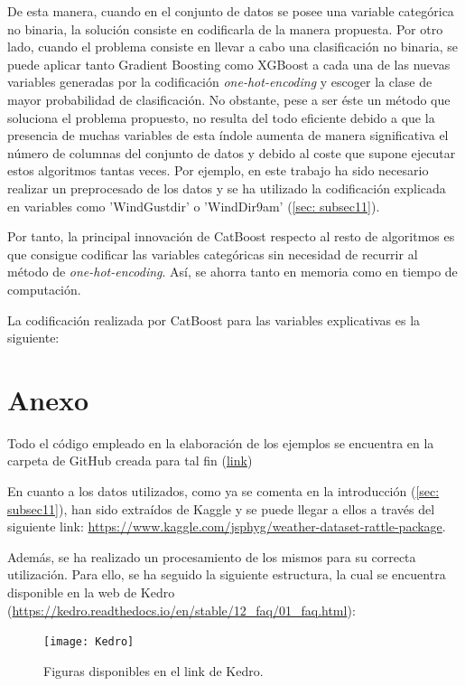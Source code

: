 \documentclass[12pt,twoside]{article}
\begin{document}
De esta manera, cuando en el conjunto de datos se posee una variable categórica no binaria, la solución consiste en codificarla de la manera propuesta. Por otro lado, cuando el problema consiste en llevar a cabo una clasificación no binaria, se puede aplicar tanto Gradient Boosting como XGBoost a cada una de las nuevas variables generadas por la codificación \textit{one-hot-encoding} y escoger la clase de mayor probabilidad de clasificación. No obstante, pese a ser éste un método que soluciona el problema propuesto, no resulta del todo eficiente debido a que la presencia de muchas variables de esta índole aumenta de manera significativa el número de columnas del conjunto de datos y debido al coste que supone ejecutar estos algoritmos tantas veces. Por ejemplo, en este trabajo ha sido necesario realizar un preprocesado de los datos y se ha utilizado la codificación explicada en variables como 'WindGustdir' o 'WindDir9am' (\ref{sec: subsec11}).

Por tanto, la principal innovación de CatBoost respecto al resto de algoritmos es que consigue codificar las variables categóricas sin necesidad de recurrir al método de \textit{one-hot-encoding}. Así, se ahorra tanto en memoria como en tiempo de computación.

La codificación realizada por CatBoost para las variables explicativas es la siguiente:










\newpage
\section{Anexo} \label{sec:Anexo}
Todo el código empleado en la elaboración de los ejemplos se encuentra en la carpeta de GitHub creada para tal fin (\url{link})

En cuanto a los datos utilizados, como ya se comenta en la introducción (\ref{sec: subsec11}), han sido extraídos de Kaggle y se puede llegar a ellos a través del siguiente link: \url{https://www.kaggle.com/jsphyg/weather-dataset-rattle-package}.

Además, se ha realizado un procesamiento de los mismos para su correcta utilización. Para ello, se ha seguido la siguiente estructura, la cual se encuentra disponible en la web de Kedro (\url{https://kedro.readthedocs.io/en/stable/12_faq/01_faq.html}):
\begin{figure}[h]
\centering
\texttt{[image: Kedro]}
\caption{Figuras disponibles en el link de Kedro.}
\end{figure}
\end{document}
